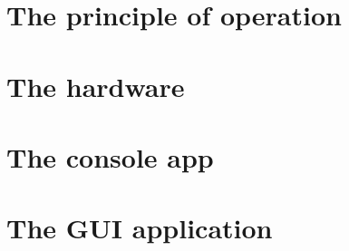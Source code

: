 \documentclass[12pt,a4paper,pdftex]{report}
\begin{document}
\part{The principle of operation}

\part{The hardware}

\part{The console app}

\part{The GUI application}


\end{document}
